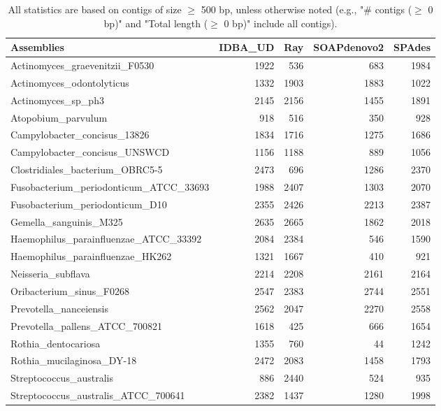 \documentclass[12pt,a4paper]{article}
\begin{document}
\begin{table}[ht]
\begin{center}
\caption{All statistics are based on contigs of size $\geq$ 500 bp, unless otherwise noted (e.g., "\# contigs ($\geq$ 0 bp)" and "Total length ($\geq$ 0 bp)" include all contigs).}
\begin{tabular}{|l*{4}{|r}|}
\hline
Assemblies & IDBA\_UD & Ray & SOAPdenovo2 & SPAdes \\ \hline
Actinomyces\_graevenitzii\_F0530 & 1922 & 536 & 683 & 1984 \\ \hline
Actinomyces\_odontolyticus & 1332 & 1903 & 1883 & 1022 \\ \hline
Actinomyces\_sp\_ph3 & 2145 & 2156 & 1455 & 1891 \\ \hline
Atopobium\_parvulum & 918 & 516 & 350 & 928 \\ \hline
Campylobacter\_concisus\_13826 & 1834 & 1716 & 1275 & 1686 \\ \hline
Campylobacter\_concisus\_UNSWCD & 1156 & 1188 & 889 & 1056 \\ \hline
Clostridiales\_bacterium\_OBRC5-5 & 2473 & 696 & 1286 & 2370 \\ \hline
Fusobacterium\_periodonticum\_ATCC\_33693 & 1988 & 2407 & 1303 & 2070 \\ \hline
Fusobacterium\_periodonticum\_D10 & 2355 & 2426 & 2213 & 2387 \\ \hline
Gemella\_sanguinis\_M325 & 2635 & 2665 & 1862 & 2018 \\ \hline
Haemophilus\_parainfluenzae\_ATCC\_33392 & 2084 & 2384 & 546 & 1590 \\ \hline
Haemophilus\_parainfluenzae\_HK262 & 1321 & 1667 & 410 & 921 \\ \hline
Neisseria\_subflava & 2214 & 2208 & 2161 & 2164 \\ \hline
Oribacterium\_sinus\_F0268 & 2547 & 2383 & 2744 & 2551 \\ \hline
Prevotella\_nanceiensis & 2562 & 2047 & 2270 & 2558 \\ \hline
Prevotella\_pallens\_ATCC\_700821 & 1618 & 425 & 666 & 1654 \\ \hline
Rothia\_dentocariosa & 1355 & 760 & 44 & 1242 \\ \hline
Rothia\_mucilaginosa\_DY-18 & 2472 & 2083 & 1458 & 1793 \\ \hline
Streptococcus\_australis & 886 & 2440 & 524 & 935 \\ \hline
Streptococcus\_australis\_ATCC\_700641 & 2382 & 1437 & 1280 & 1998 \\ \hline

\end{tabular}
\end{center}
\end{table}
\end{document}
